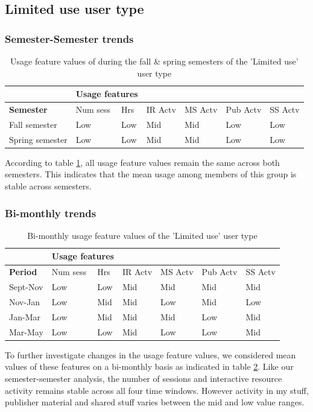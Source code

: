 \documentclass{acm_proc_article-sp}
\begin{document}
\subsection{Limited use user type}
\subsubsection{Semester-Semester trends}
\begin{table}
\caption{Usage feature values of during the fall \& spring semesters of the 'Limited use' user type}
\label{cluster0semester}
\begin{tabular}{|p{1.5cm}|p{0.6cm}|p{0.6cm}|p{0.6cm}|p{0.6cm}|p{0.8cm}|p{0.8cm}|}
& \multicolumn{2}{r}{\textbf{Usage features}}  \\ \hline
 \textbf{Semester} & Num sess & Hrs & IR Actv & MS Actv & Pub Actv & SS Actv \\ \hline
 Fall  semester & Low & Low  & Mid & Mid & Low & Low \\ \hline
Spring semester & Low & Low  & Mid & Mid & Low & Low \\ \hline
\end{tabular}
\end{table}
According to table \ref{cluster0semester}, all usage feature values remain the same across both semesters. This indicates that the mean usage among members of this group is stable across semesters.
\subsubsection{Bi-monthly trends}
\begin{table}
\caption{Bi-monthly usage feature values of the 'Limited use' user type}
\label{cluster0bimonthly}
\begin{tabular}{|p{1.5cm}|p{0.6cm}|p{0.6cm}|p{0.6cm}|p{0.6cm}|p{0.8cm}|p{0.8cm}|}
& \multicolumn{2}{r}{\textbf{Usage features}}  \\ \hline
 \textbf{Period} 
 & Num sess & Hrs & IR Actv & MS Actv & Pub Actv & SS Actv \\ \hline
Sept-Nov & Low & Low  & Mid & Mid & Mid & Mid \\ \hline
Nov-Jan & Low & Mid  & Mid & Low & Mid & Low \\ \hline
Jan-Mar & Low & Mid  & Mid & Mid & Low & Mid \\ \hline
Mar-May & Low & Low  & Mid & Low & Low & Mid \\ \hline
\end{tabular}
\end{table}
To further investigate changes in the usage feature values, we considered mean values of these features on a bi-monthly basis as indicated in table \ref{cluster0bimonthly}. Like our semester-semester analysis, the number of sessions and interactive resource activity remains stable across all four time windows.  However activity in my stuff, publisher material and shared stuff  varies between the mid and low value ranges. 
\end{document}
